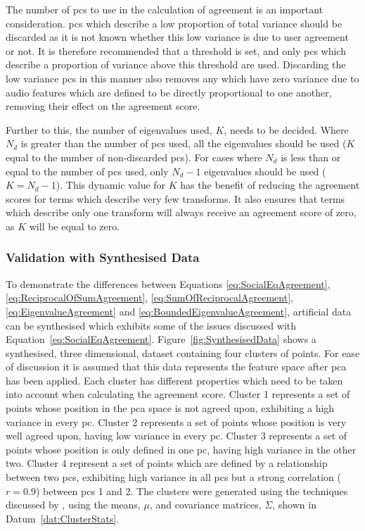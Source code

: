 			The number of \acrshort{pc}s to use in the calculation of agreement is an important consideration.
			\acrshort{pc}s which describe a low proportion of total variance should be discarded as it is
			not known whether this low variance is due to user agreement or not. It is therefore recommended
			that a threshold is set, and only \acrshort{pc}s which describe a proportion of variance above this
			threshold are used. Discarding the low variance \acrshort{pc}s in this manner also removes any
			which have zero variance due to audio features which are defined to be directly proportional to one
			another, removing their effect on the agreement score.

			Further to this, the number of eigenvalues used, $K$, needs to be decided. Where $N_{d}$ is greater
			than the number of \acrshort{pc}s used, all the eigenvalues should be used ($K$ equal to the number
			of non-discarded \acrshort{pc}s).  For cases where $N_{d}$ is less than or equal to the number of
			\acrshort{pc}s used, only $N_{d} - 1$ eigenvalues should be used ($K = N_{d} - 1$). This dynamic
			value for $K$ has the benefit of reducing the agreement scores for terms which describe very few
			transforms. It also ensures that terms which describe only one transform will always receive an
			agreement score of zero, as $K$ will be equal to zero.

		\subsubsection*{Validation with Synthesised Data}
			To demonstrate the differences between Equations \ref{eq:SocialEqAgreement},
			\ref{eq:ReciprocalOfSumAgreement}, \ref{eq:SumOfReciprocalAgreement}, \ref{eq:EigenvalueAgreement}
			and \ref{eq:BoundedEigenvalueAgreement}, artificial data can be synthesised which exhibits some of
			the issues discussed with Equation~\ref{eq:SocialEqAgreement}.  Figure~\ref{fig:SynthesisedData}
			shows a synthesised, three dimensional, dataset containing four clusters of points. For ease of
			discussion it is assumed that this data represents the feature space after \acrshort{pca} has been
			applied. Each cluster has different properties which need to be taken into account when calculating
			the agreement score. Cluster 1 represents a set of points whose position in the \acrshort{pca}
			space is not agreed upon, exhibiting a high variance in every \acrshort{pc}.  Cluster 2 represents
			a set of points whose position is very well agreed upon, having low variance in every
			\acrshort{pc}. Cluster 3 represents a set of points whose position is only defined in one
			\acrshort{pc}, having high variance in the other two. Cluster 4 represent a set of points which are
			defined by a relationship between two \acrshort{pc}s, exhibiting high variance in all
			\acrshort{pc}s but a strong correlation ($r = 0.9$) between \acrshort{pc}s 1 and 2. The clusters
			were generated using the techniques discussed by \citet{ripley1987stochastic}, using the means,
			$\mu$, and covariance matrices, $\Sigma$, shown in Datum~\ref{dat:ClusterStats}.

